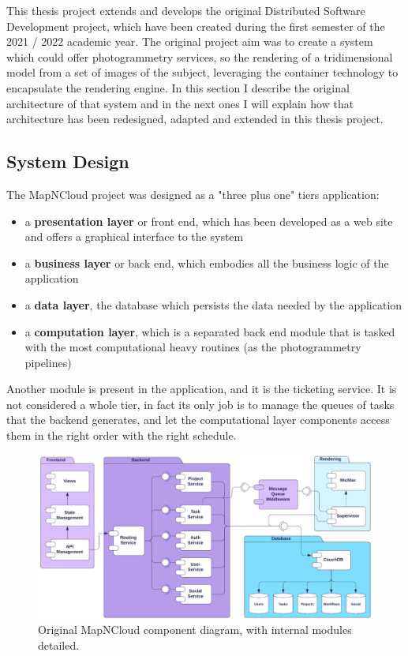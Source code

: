 This thesis project extends and develops the original Distributed Software Development project, which have been created during the first semester of the 2021 / 2022 academic year. The original project aim was to create a system which could offer photogrammetry services, so the rendering of a tridimensional model from a set of images of the subject, leveraging the container technology to encapsulate the rendering engine. In this section I describe the original architecture of that system and in the next ones I will explain how that architecture has been redesigned, adapted and extended in this thesis project. 

\subsection{System Design}
\label{sse:originalsystemdesign}
  The MapNCloud project was designed as a "three plus one" tiers application:
  \begin{itemize}
    \item a \textbf{presentation layer} or front end, which has been developed as a web site and offers a graphical interface to the system
    \item a \textbf{business layer} or back end, which embodies all the business logic of the application
    \item a \textbf{data layer}, the database which persists the data needed by the application
    \item a \textbf{computation layer}, which is a separated back end module that is tasked with the most computational heavy routines (as the photogrammetry pipelines)
  \end{itemize}
  Another module is present in the application, and it is the ticketing service. It is not considered a whole tier, in fact its only job is to manage the queues of tasks that the backend generates, and let the computational layer components access them in the right order with the right schedule.
  \begin{figure}[H]
    \centering
    \includegraphics[width = \textwidth]{../Images/MNCOriginal.png}
    \caption{Original MapNCloud component diagram, with internal modules detailed.}
  \end{figure}

